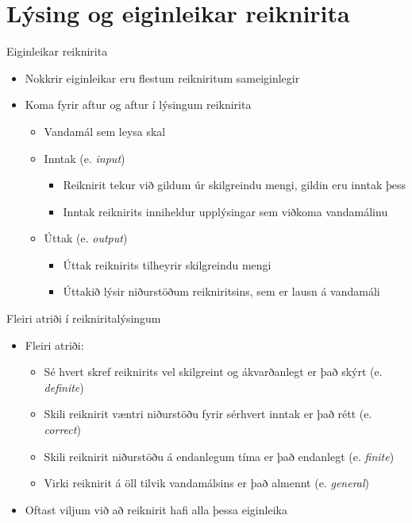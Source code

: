 \documentclass[handout]{beamer}
\begin{document}
\section{Lýsing og eiginleikar reiknirita}

\begin{frame}{Eiginleikar reiknirita}
\begin{itemize}
 \item Nokkrir eiginleikar eru flestum reikniritum sameiginlegir
 \item Koma fyrir aftur og aftur í lýsingum reiknirita
 \begin{itemize}
  \item Vandamál sem leysa skal
  \item Inntak (e. \emph{input})
  \begin{itemize}
   \item Reiknirit tekur við gildum úr skilgreindu mengi, gildin eru inntak þess
   \item Inntak reiknirits inniheldur upplýsingar sem viðkoma vandamálinu
  \end{itemize}
  \item Úttak (e. \emph{output})
  \begin{itemize}
   \item Úttak reiknirits tilheyrir skilgreindu mengi
   \item Úttakið lýsir niðurstöðum reikniritsins, sem er lausn á vandamáli
  \end{itemize}
 \end{itemize}
\end{itemize}
\end{frame}

\begin{frame}{Fleiri atriði í reikniritalýsingum}
\begin{itemize}
 \item Fleiri atriði:
 \begin{itemize}
  \item Sé hvert skref reiknirits vel skilgreint og ákvarðanlegt er það skýrt (e. \emph{definite})
  \item Skili reiknirit væntri niðurstöðu fyrir sérhvert inntak er það rétt (e. \emph{correct})
  \item Skili reiknirit niðurstöðu á endanlegum tíma er það endanlegt (e. \emph{finite})
  \item Virki reiknirit á öll tilvik vandamálsins er það almennt (e. \emph{general})
 \end{itemize}
 \item Oftast viljum við að reiknirit hafi alla þessa eiginleika
\end{itemize}
\end{frame}
\end{document}
